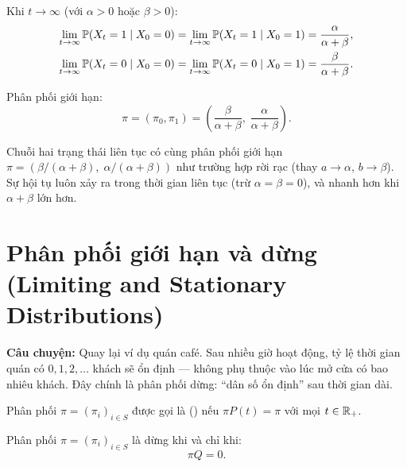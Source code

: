 Khi $t \to \infty$ (với $\alpha > 0$ hoặc $\beta > 0$):
\begin{align}
  \lim_{t\to\infty} \mathbb{P}(X_t = 1 \mid X_0 = 0) &= \lim_{t\to\infty} \mathbb{P}(X_t = 1 \mid X_0 = 1) = \frac{\alpha}{\alpha+\beta}, \label{eq:ct-limit-1}\\
  \lim_{t\to\infty} \mathbb{P}(X_t = 0 \mid X_0 = 0) &= \lim_{t\to\infty} \mathbb{P}(X_t = 0 \mid X_0 = 1) = \frac{\beta}{\alpha+\beta}. \label{eq:ct-limit-0}
\end{align}

Phân phối giới hạn:
\begin{equation}\label{eq:ct-pi}
  \pi = (\pi_0, \pi_1) = \left(\frac{\beta}{\alpha+\beta},\; \frac{\alpha}{\alpha+\beta}\right).
\end{equation}

\begin{tomtat}
Chuỗi hai trạng thái liên tục có cùng phân phối giới hạn $\pi = (\beta/(\alpha+\beta),\; \alpha/(\alpha+\beta))$ như trường hợp rời rạc (thay $a \to \alpha$, $b \to \beta$).
Sự hội tụ luôn xảy ra trong thời gian liên tục (trừ $\alpha = \beta = 0$), và nhanh hơn khi $\alpha + \beta$ lớn hơn.
\end{tomtat}

\section{Phân phối giới hạn và dừng (Limiting and Stationary Distributions)}
\label{sec:ct-stationary}

\textbf{Câu chuyện:} Quay lại ví dụ quán café. Sau nhiều giờ hoạt động, tỷ lệ thời gian quán có $0, 1, 2, \ldots$ khách
sẽ ổn định --- không phụ thuộc vào lúc mở cửa có bao nhiêu khách.
Đây chính là phân phối dừng: ``dân số ổn định'' sau thời gian dài.

\begin{dinhnghia}
Phân phối $\pi = (\pi_i)_{i\in S}$ được gọi là  () nếu $\pi P(t) = \pi$ với mọi $t \in \mathbb{R}_+$.
\end{dinhnghia}

\begin{proposition}[(Mệnh đề 4)]
Phân phối $\pi = (\pi_i)_{i\in S}$ là dừng khi và chỉ khi:
\begin{equation}\label{eq:pi-Q}
  \pi Q = 0.
\end{equation}
\end{proposition}

